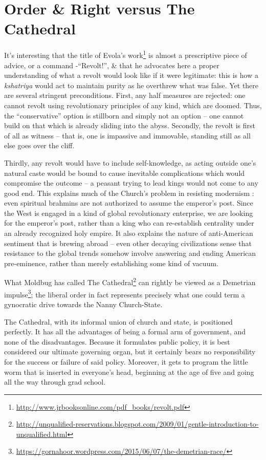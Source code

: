 \section{Order \& Right versus The Cathedral}

It's interesting that the title of Evola's work\footnote{\url{http://www.jrbooksonline.com/pdf\_books/revolt.pdf}} is almost a prescriptive piece of advice, or a command -``Revolt!'', \& that he advocates here a proper understanding of what a revolt would look like if it were legitimate: this is how a \emph{kshatriya} would act to maintain purity as he overthrew what was false. Yet there are several stringent preconditions. First, any half measures are rejected: one cannot revolt using revolutionary principles of any kind, which are doomed. Thus, the ``conservative'' option is stillborn and simply not an option -- one cannot build on that which is already sliding into the abyss. Secondly, the revolt is first of all as witness -- that is, one is impassive and immovable, standing still as all else goes over the cliff.

Thirdly, any revolt would have to include self-knowledge, as acting outside one's natural caste would be bound to cause inevitable complications which would compromise the outcome -- a peasant trying to lead kings would not come to any good end. This explains much of the Church's problem in resisting modernism : even spiritual brahmins are not authorized to assume the emperor's post. Since the West is engaged in a kind of global revolutionary enterprise, we are looking for the emperor's post, rather than a king who can re-establish centrality under an already recognized holy empire. It also explains the nature of anti-American sentiment that is brewing abroad -- even other decaying civilizations sense that resistance to the global trends somehow involve answering and ending American pre-eminence, rather than merely establishing some kind of vacuum.

What Moldbug has called The Cathedral\footnote{\url{http://unqualified-reservations.blogspot.com/2009/01/gentle-introduction-to-unqualified.html}} can rightly be viewed as a Demetrian impulse\footnote{\url{https://gornahoor.wordpress.com/2015/06/07/the-demetrian-race/}}; the liberal order in fact represents precisely what one could term a gynocratic drive towards the Nanny Church-State.

\begin{quotex}
The Cathedral, with its informal union of church and state, is positioned perfectly. It has all the advantages of being a formal arm of government, and none of the disadvantages. Because it formulates public policy, it is best considered our ultimate governing organ, but it certainly bears no responsibility for the success or failure of said policy. Moreover, it gets to program the little worm that is inserted in everyone's head, beginning at the age of five and going all the way through grad school.
\end{quotex}


